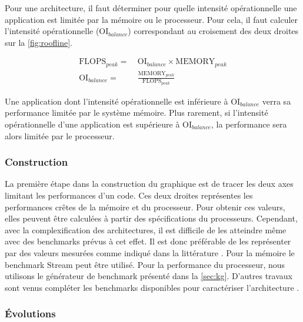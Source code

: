 Pour une architecture, il faut déterminer pour quelle intensité opérationnelle une application est limitée par la mémoire ou le processeur. Pour cela, il faut calculer l’intensité opérationnelle ($\text{OI}_{balance}$) correspondant au croisement des deux droites sur la \autoref{fig:roofline}. 

\begin{equation}
\begin{aligned}
 \text{FLOPS}_{peak} =\ &\text{OI}_{balance} \times \text{MEMORY}_{peak} \\[20pt]
 \text{OI}_{balance} =\ &\frac{\text{MEMORY}_{peak}} {\text{FLOPS}_{peak}} 
\end{aligned}
\end{equation}

Une application dont l’intensité opérationnelle est inférieure à $\text{OI}_{balance}$ verra sa performance limitée par le système mémoire. Plus rarement, si l’intensité opérationnelle d’une application est supérieure à $\text{OI}_{balance}$, la performance sera alors limitée par le processeur.

\subsubsection{Construction}
La première étape dans la construction du graphique est de tracer les deux axes limitant les performances d’un code. Ces deux droites représentes les performances crêtes de la mémoire et du processeur. Pour obtenir ces valeurs, elles peuvent être calculées à partir des spécifications du processeurs. Cependant, avec la complexification des architectures, il est difficile de les atteindre même avec des benchmarks prévus à cet effet. Il est donc préférable de les représenter par des valeurs mesurées comme indiqué dans la littérature  \cite{farjallah2014preparing}. Pour la mémoire le benchmark Stream peut être utilisé. Pour la performance du processeur, nous utilisons le générateur de benchmark présenté dans la \autoref{sec:kg}. D’autres travaux sont venus compléter les benchmarks disponibles pour caractériser l’architecture \cite{lo2014roofline}.




\subsubsection{Évolutions}


